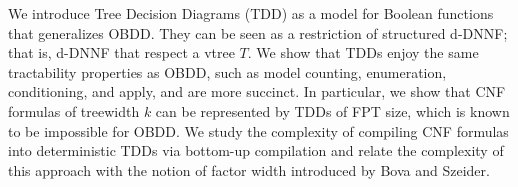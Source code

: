 We introduce Tree Decision Diagrams (TDD) as a model for Boolean functions that generalizes OBDD. They can be seen as a restriction of structured d-DNNF; that is, d-DNNF that respect a vtree $T$. We show that TDDs
enjoy the same tractability properties as OBDD, such as model counting, enumeration, conditioning, and apply, and are more succinct. In particular, we show that CNF formulas of treewidth $k$ can be represented by TDDs of FPT size, which is known to be impossible for OBDD.  We study the complexity of compiling CNF formulas into deterministic TDDs via bottom-up compilation and relate the complexity of this approach with the notion of factor width introduced by Bova and Szeider.
